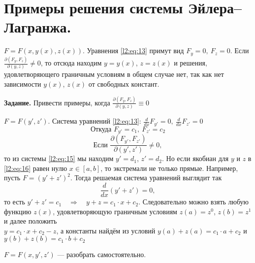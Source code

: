 \documentclass[12pt,a4paper,openany,fleqn]{book}
\newcommand{\der}[2]{\ensuremath{\frac{d#1}{d#2}}}
\newcommand{\pder}[2]{\ensuremath{\frac{\partial#1}{\partial#2}}}
\theoremstyle{definition}
\begin{document}
\section{Примеры решения системы Эйлера--Лагранжа.}
\label{lecture2section3}
\begin{enumerate1}
	\item $F=F(x,y(x),z(x))$. Уравнения \eqref{l2:eq:13} примут вид $F_y=0,\ F_z=0$. Если $\displaystyle\pder{(F_y,F_z)}{(y,z)}\neq0$, то отсюда находим $y=y(x)$, $z=z(x)$ и решения, удовлетворяющего граничным условиям в общем случае нет, так как нет зависимости $y(x)$, $z(x)$ от свободных констант.
	\vspace{0.2cm}
	
	\noindent\textbf{Задание.} Привести примеры, когда $\displaystyle\pder{(F_y,F_z)}{(y,z)}\equiv0$
	
	\item $F=F(y',z')$. Система уравнений \eqref{l2:eq:13}: $\displaystyle\der{}{x}F_{y'}=0,\ \der{}{x}F_{z'}=0$ 
	\begin{equation}
		\label{l2:eq:15}
		\text{Откуда }F_{y'}=c_1,\ F_{z'}=c_2
	\end{equation}
\vspace{-0.5cm}
\begin{equation}
	\label{l2:eq:16}
	\text{Если }\pder{(F_{y'},F_{z'})}{(y',z')}\neq0,
\end{equation} 
то из системы \eqref{l2:eq:15} мы находим $y'=d_1$, $z'=d_2$. Но если якобиан для $y$ и $z$ в \eqref{l2:eq:16} равен нулю $x\in[a,b]$, то экстремали не только прямые. Например, пусть $F=(y'+z')^2$. Тогда решаемая система уравнений выглядит так
\begin{equation*}
	\der{}{x}(y'+z')=0,	
\end{equation*}  
то есть $y'+z'=c_1\quad\Rightarrow\quad y+z=c_1\cdot x+c_2$. Следовательно можно взять любую функцию $z(x)$, удовлетворяющую граничным условиям $z(a)=z^0$, $z(b)=z^1$ и далее положить \\$y=c_1\cdot x+c_2-z$, а константы найдём из условий $y(a)+z(a)=c_1\cdot a+c_2$ и $y(b)+z(b)=c_1\cdot b+c_2$

\item $F=F(x,y',z')$ --- разобрать самостоятельно.


\end{enumerate1}
\end{document}
